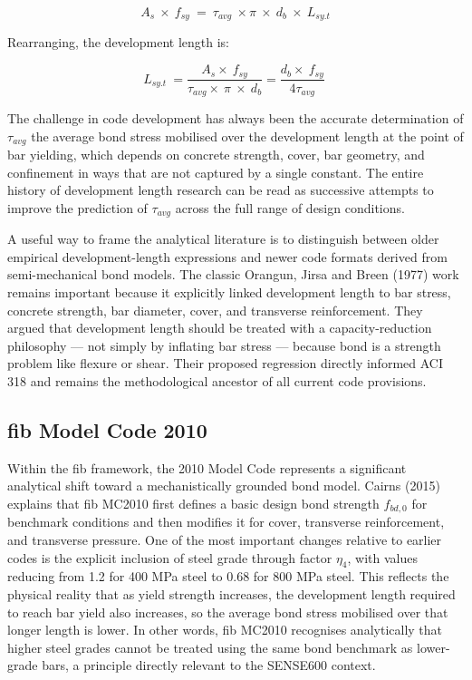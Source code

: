 \begin{equation}
    A_{s}\ \times \ f_{sy}\ =\ {\tau }_{avg}\ \times \pi \ \times \ d_{b}\ \times \ L_{sy.t}
\end{equation}

Rearranging, the development length is:

\begin{equation}
    L_{sy.t}\ =\frac{A_{s}\times \ f_{sy}}{{\tau }_{avg}\times \ \pi \ \times \ d_{b}}=\frac{d_{b}\times \ f_{sy}}{4{\tau }_{avg}}\ 
\end{equation}

The challenge in code development has always been the accurate determination of ${\tau }_{avg}$ the average bond stress mobilised over the development length at the point of bar yielding, which depends on concrete strength, cover, bar geometry, and confinement in ways that are not captured by a single constant. The entire history of development length research can be read as successive attempts to improve the prediction of ${\tau }_{avg}$ across the full range of design conditions.

A useful way to frame the analytical literature is to distinguish between older empirical development-length expressions and newer code formats derived from semi-mechanical bond models. The classic Orangun, Jirsa and Breen (1977) work remains important because it explicitly linked development length to bar stress, concrete strength, bar diameter, cover, and transverse reinforcement. They argued that development length should be treated with a capacity-reduction philosophy — not simply by inflating bar stress — because bond is a strength problem like flexure or shear. Their proposed regression directly informed ACI 318 and remains the methodological ancestor of all current code provisions.

\subsection{fib Model Code 2010}
Within the fib framework, the 2010 Model Code represents a significant analytical shift toward a mechanistically grounded bond model. Cairns (2015) explains that fib MC2010 first defines a basic design bond strength $f_{bd,0}$ for benchmark conditions and then modifies it for cover, transverse reinforcement, and transverse pressure. One of the most important changes relative to earlier codes is the explicit inclusion of steel grade through factor ${\eta }_{4}$, with values reducing from 1.2 for 400 MPa steel to 0.68 for 800 MPa steel. This reflects the physical reality that as yield strength increases, the development length required to reach bar yield also increases, so the average bond stress mobilised over that longer length is lower. In other words, fib MC2010 recognises analytically that higher steel grades cannot be treated using the same bond benchmark as lower-grade bars, a principle directly relevant to the SENSE600 context.

